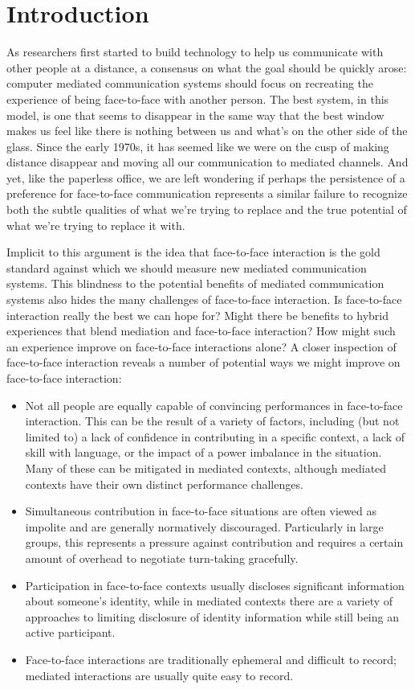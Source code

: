\chapter{Introduction}

As researchers first started to build technology to help us communicate with other people at a distance, a consensus on what the goal should be quickly arose: computer mediated communication systems should focus on recreating the experience of being face-to-face with another person. The best system, in this model, is one that seems to disappear in the same way that the best window makes us feel like there is nothing between us and what's on the other side of the glass. Since the early 1970s, it has seemed like we were on the cusp of making distance disappear and moving all our communication to mediated channels. \citep{Egido:1988vq} And yet, like the paperless office, we are left wondering if perhaps the persistence of a preference for face-to-face communication represents a similar failure to recognize both the subtle qualities of what we're trying to replace and the true potential of what we're trying to replace it with. 

Implicit to this argument is the idea that face-to-face interaction is the gold standard against which we should measure new mediated communication systems. This blindness to the potential benefits of mediated communication systems also hides the many challenges of face-to-face interaction. Is face-to-face interaction really the best we can hope for? Might there be benefits to hybrid experiences that blend mediation and face-to-face interaction? How might such an experience improve on face-to-face interactions alone? A closer inspection of face-to-face interaction reveals a number of potential ways we might improve on face-to-face interaction:


\begin{itemize}
\item Not all people are equally capable of convincing performances in face-to-face interaction. This can be the result of a variety of factors, including (but not limited to) a lack of confidence in contributing in a specific context, a lack of skill with language, or the impact of a power imbalance in the situation. Many of these can be mitigated in mediated contexts\citep{Siegel:1986ve}, although mediated contexts have their own distinct performance challenges.
\item Simultaneous contribution in face-to-face situations are often viewed as impolite and are generally normatively discouraged. Particularly in large groups, this represents a pressure against contribution and requires a certain amount of overhead to negotiate turn-taking gracefully.
\item Participation in face-to-face contexts usually discloses significant information about someone's identity, while in mediated contexts there are a variety of approaches to limiting disclosure of identity information while still being an active participant.
\item Face-to-face interactions are traditionally ephemeral and difficult to record; mediated interactions are usually quite easy to record. 
\end{itemize}


